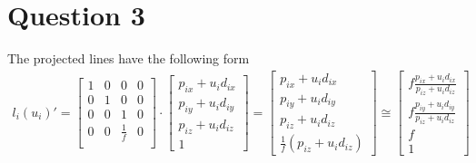 \documentclass{article} %
\begin{document}
\section{Question 3}

The projected lines have the following form
\begin{align*}
l_i(u_i)' =
\begin{bmatrix}
1 & 0 & 0 & 0\\
0 & 1 & 0 & 0\\
0 & 0 & 1 & 0\\
0 & 0 & \frac{1}{f} & 0\\
\end{bmatrix}
\cdot
\begin{bmatrix}
p_{ix} + u_i d_{ix}\\
p_{iy} + u_i d_{iy}\\
p_{iz} + u_i d_{iz}\\
1
\end{bmatrix}
=
\begin{bmatrix}
p_{ix} + u_i d_{ix}\\
p_{iy} + u_i d_{iy}\\
p_{iz} + u_i d_{iz}\\
\frac{1}{f} \left(p_{iz} + u_i d_{iz}\right)
\end{bmatrix}
\cong
\begin{bmatrix}
f\frac{p_{ix} + u_i d_{ix}}{p_{iz} + u_i d_{iz}}\\
f\frac{p_{iy} + u_i d_{iy}}{p_{iz} + u_i d_{iz}}\\
f\\
1
\end{bmatrix}
\end{align*}
\end{document}
